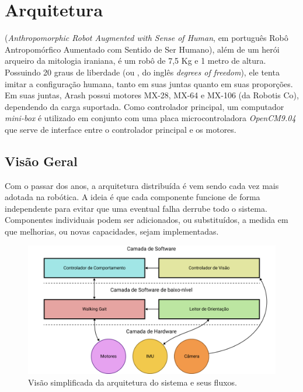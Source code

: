 \chapter{Arquitetura}
\label{ch:architecture}

(\textit{Anthropomorphic Robot Augmented with Sense of Human}, em português Robô Antropomórfico Aumentado com Sentido de Ser Humano), além de um herói arqueiro da mitologia iraniana, é um robô de 7,5 Kg e 1 metro de altura. Possuindo 20 graus de liberdade (ou , do inglês \textit{degrees of freedom}), ele tenta imitar a configuração humana, tanto em suas juntas quanto em suas proporções. Em suas juntas, Arash possui motores MX-28, MX-64 e MX-106 (da Robotis Co), dependendo da carga suportada. Como controlador principal, um computador \textit{mini-box} é utilizado em conjunto com uma placa microcontroladora \textit{OpenCM9.04} que serve de interface entre o controlador principal e os motores.

\section{Visão Geral}
\label{sec:architecture:overview}

Com o passar dos anos, a arquitetura distribuída é vem sendo cada vez mais adotada na robótica. A ideia é que cada componente funcione de forma independente para evitar que uma eventual falha derrube todo o sistema. Componentes individuais podem ser adicionados, ou substituídos, a medida em que melhorias, ou novas capacidades, sejam implementadas.

\begin{figure}[htb]
	\centering
	\includegraphics[scale=1]{imagens/svg/softwarearchitecture-flow}
	\caption{Visão simplificada da arquitetura do sistema e seus fluxos.}
	\label{fig:softwarearchitecture:overview}
\end{figure}

